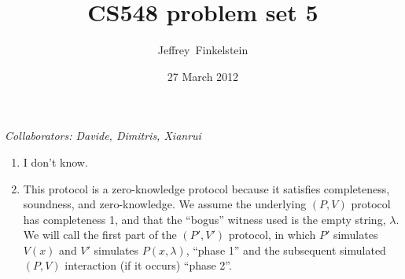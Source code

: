 \documentclass[draft]{article}
\author{Jef{}frey~Finkelstein}
\date{27 March 2012}
\title{CS548 problem set 5}
\newcommand{\collaborators}[1]{\emph{Collaborators: #1}}
\begin{document}
\maketitle
\collaborators{Davide, Dimitris, Xianrui}
\begin{enumerate}
\item I don't know.
\item 
  This protocol is a zero-knowledge protocol because it satisfies completeness, soundness, and zero-knowledge.
  We assume the underlying $(P, V)$ protocol has completeness 1, and that the ``bogus'' witness used is the empty string, $\lambda$.
  We will call the first part of the $(P', V')$ protocol, in which $P'$ simulates $V(x)$ and $V'$ simulates $P(x, \lambda)$, ``phase 1'' and the subsequent simulated $(P, V)$ interaction (if it occurs) ``phase 2''.


\end{enumerate}
\end{document}
